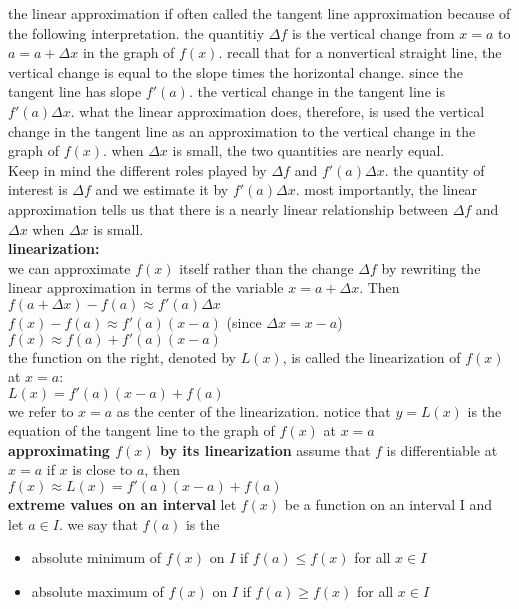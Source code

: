 \documentclass{article}
\begin{document}
the linear approximation if often called the tangent line approximation because of the following interpretation. the quantitiy $\Delta f$ is the vertical change from $x = a$ to $a = a + \Delta x$ in the graph of $f(x)$. recall that for a nonvertical straight line, the vertical change is equal to the slope times the horizontal change. since the tangent line has slope $f'(a)$. the vertical change in the tangent line is $f'(a)\Delta x$. what the linear approximation does, therefore, is used the vertical change in the tangent line as an approximation to the vertical change in the graph of $f(x)$. when $\Delta x$ is small, the two quantities are nearly equal.\\

Keep in mind the different roles played by $\Delta f$ and $f'(a)\Delta x$. the quantity of interest is $\Delta f$ and we estimate it by $f'(a)\Delta x$. most importantly, the linear approximation tells us that there is a nearly linear relationship between $\Delta f$ and $\Delta x$ when $\Delta x$ is small.\\

\textbf{linearization:}\\
we can approximate $f(x)$ itself rather than the change $\Delta f$ by rewriting the linear approximation in terms of the variable $x = a + \Delta x$. Then\\ $f(a + \Delta x) - f(a) \approx f'(a)\Delta x$\\ $f(x) - f(a) \approx f'(a)(x - a)$ (since $\Delta x = x - a$)\\ $f(x) \approx f(a) + f'(a)(x - a)$\\ the function on the right, denoted by $L(x)$, is called the linearization of $f(x)$ at $x = a$:\\ $L(x) = f'(a)(x - a) + f(a)$\\ we refer to $x = a$ as the center of the linearization. notice that $y = L(x)$ is the equation of the tangent line to the graph of $f(x)$ at $x = a$\\

\textbf{approximating $f(x)$ by its linearization} assume that $f$ is differentiable at $x = a$ if $x$ is close to $a$, then\\ $f(x) \approx L(x) = f'(a)(x - a) + f(a)$\\

\textbf{extreme values on an interval} let $f(x)$ be a function on an interval I and let $a \in I$. we say that $f(a)$ is the
	\begin{itemize}
		\item absolute minimum of $f(x)$ on $I$ if $f(a) \leq f(x)$ for all $x \in I$
		\item absolute maximum of $f(x)$ on $I$ if $f(a) \geq f(x)$ for all $x \in I$
	\end{itemize}
\end{document}
